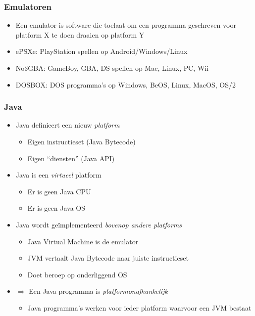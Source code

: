 \begin{frame}
  \frametitle{Emulatoren}
  \begin{itemize}
    \item Een emulator is software die toelaat om een programma geschreven voor platform X
          te doen draaien op platform Y
  \end{itemize}
  \vskip4mm
  \begin{itemize}
    \item ePSXe: PlayStation spellen op Android/Windows/Linux
    \item No\$GBA: GameBoy, GBA, DS spellen op Mac, Linux, PC, Wii
    \item DOSBOX: DOS programma's op Windows, BeOS, Linux, MacOS, OS/2
  \end{itemize}
\end{frame}

\begin{frame}
  \frametitle{Java}
  \begin{itemize}
    \item Java definieert een nieuw \emph{platform}
          \begin{itemize}
            \item Eigen instructieset (Java Bytecode)
            \item Eigen ``diensten'' (Java API)
          \end{itemize}
    \item Java is een \emph{virtueel} platform
          \begin{itemize}
            \item Er is geen Java CPU
            \item Er is geen Java OS
          \end{itemize}
    \item Java wordt ge\"implementeerd \emph{bovenop andere platforms}
          \begin{itemize}
            \item Java Virtual Machine is de emulator
            \item JVM vertaalt Java Bytecode naar juiste instructieset
            \item Doet beroep op onderliggend OS
          \end{itemize}
    \item $\Rightarrow$ Een Java programma is \emph{platformonafhankelijk}
          \begin{itemize}
            \item Java programma's werken voor ieder platform waarvoor een JVM bestaat
          \end{itemize}
  \end{itemize}
\end{frame}

